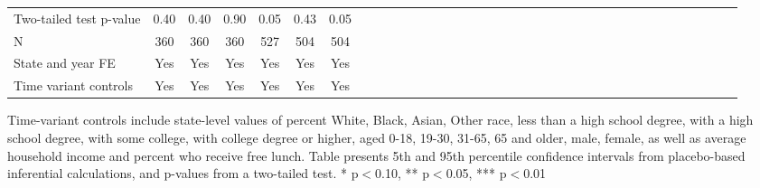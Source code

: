 \begin{table}[htbp]
\begin{center}
\begin{threeparttable}
\begin{tabular}{l*{6}{c c c c c c}}
Two-tailed test p-value&        0.40   &        0.40   &        0.90   &       \cellcolor[cmyk]{0.2,0,0,0} 0.05   &      \cellcolor[cmyk]{0.2,0,0,0}  0.43   &     \cellcolor[cmyk]{0.2,0,0,0}   0.05   \\
N                   &         360   &         360   &         360   &         527   &         504   &         504   \\
\midrule
State and year FE                              & Yes   & Yes   & Yes   & Yes   & Yes   & Yes            \\
Time variant controls                  & Yes   & Yes   & Yes   & Yes   & Yes   & Yes            \\
\bottomrule
\end{tabular}
\begin{tablenotes}
\tiny
\item Time-variant controls include state-level values of percent White, Black, Asian, Other race, less than a high school degree, with a high school degree, with some college, with college degree or higher, aged 0-18, 19-30, 31-65, 65 and older, male, female, as well as average household income and percent who receive free lunch.  Table presents 5th and 95th percentile confidence intervals from placebo-based inferential calculations, and p-values from a two-tailed test. * p$<$0.10, ** p$<$0.05, *** p$<$0.01
\end{tablenotes}
\end{threeparttable}
\end{center}
\end{table}
